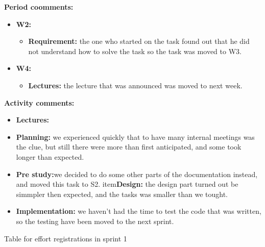 \begin{table}
\textbf{Period coomments:}
\begin{itemize}
\item{}\textbf{W2:} 
\begin{itemize}
\item{}\textbf{Requirement:} the one who started on the task found out that he did not understand how to solve the task so the task was moved to W3. 
\end{itemize}
\item{}\textbf{W4:}
\begin{itemize}
\item{} \textbf{Lectures:} the lecture that was announced was moved to next week. 
\end{itemize}
\end{itemize}


\textbf{Activity comments:}
\begin{itemize}
\item{} \textbf{Lectures:} 
\item{}\textbf{Planning:} we experienced quickly that to have many internal meetings was the clue, but still there were more than first anticipated, and some took longer than expected. 
\item{}\textbf{Pre study:}we decided to do some other parts of the documentation instead, and moved this task to S2. item{}\textbf{Design:} the design part turned out be simmpler then expected, and the tasks was smaller than we tought. \item{}\textbf{Implementation:} we haven't had the time to test the code that was written, so the testing have been moved to the next sprint.
\end{itemize}
\caption{Table for effort registrations in sprint 1} \label{tab:effortweekss1}
\end{table}